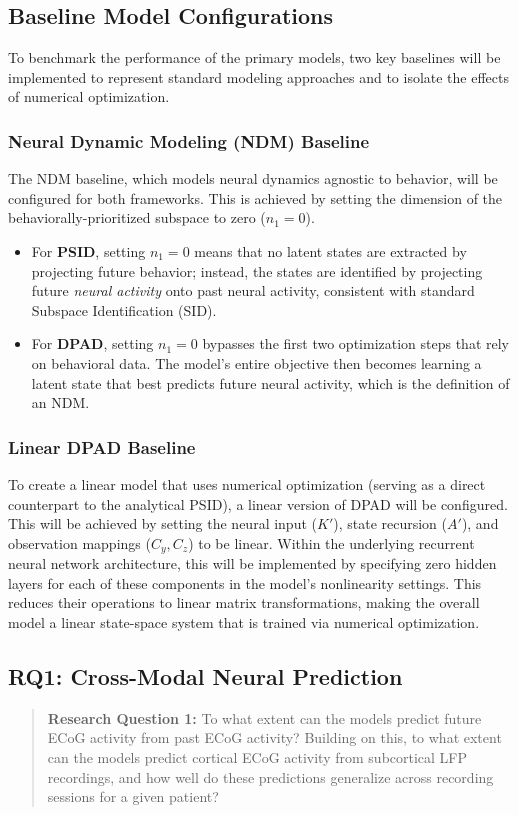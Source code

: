 \documentclass[12pt, a4paper]{article}
\begin{document}
\subsection{Baseline Model Configurations}
To benchmark the performance of the primary models, two key baselines will be implemented to represent standard modeling approaches and to isolate the effects of numerical optimization.

\subsubsection{Neural Dynamic Modeling (NDM) Baseline}

The NDM baseline, which models neural dynamics agnostic to behavior, will be configured for both frameworks. This is achieved by setting the dimension of the behaviorally-prioritized subspace to zero ($n_1 = 0$).
    \begin{itemize}
        \item For \textbf{PSID}, setting $n_1=0$ means that no latent states are extracted by projecting future behavior; instead, the states are identified by projecting future \textit{neural activity} onto past neural activity, consistent with standard Subspace Identification (SID).
        \item For \textbf{DPAD}, setting $n_1=0$ bypasses the first two optimization steps that rely on behavioral data. The model's entire objective then becomes learning a latent state that best predicts future neural activity, which is the definition of an NDM.
    \end{itemize}

\subsubsection{Linear DPAD Baseline}
To create a linear model that uses numerical optimization (serving as a direct counterpart to the analytical PSID), a linear version of DPAD will be configured. This will be achieved by setting the neural input ($K'$), state recursion ($A'$), and observation mappings ($C_y, C_z$) to be linear. Within the underlying recurrent neural network architecture, this will be implemented by specifying zero hidden layers for each of these components in the model's nonlinearity settings. This reduces their operations to linear matrix transformations, making the overall model a linear state-space system that is trained via numerical optimization.

\subsection{RQ1: Cross-Modal Neural Prediction}
\begin{quote}
    \textbf{Research Question 1:} To what extent can the models predict future ECoG activity from past ECoG activity? Building on this, to what extent can the models predict cortical ECoG activity from subcortical LFP recordings, and how well do these predictions generalize across recording sessions for a given patient?
\end{quote}
\end{document}
